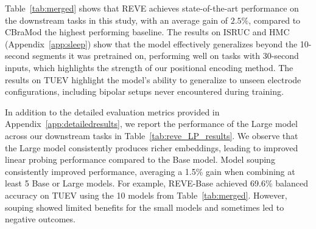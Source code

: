 \documentclass{article}
\begin{document}
Table~\ref{tab:merged} shows that REVE achieves state-of-the-art performance on the downstream tasks in this study, with an average gain of $2.5\%$, compared to CBraMod the highest performing baseline.
The results on ISRUC and HMC (Appendix~\ref{app:sleep}) show that the model effectively generalizes beyond the 10-second segments it was pretrained on, performing well on tasks with 30-second inputs, which highlights the strength of our positional encoding method. The results on TUEV highlight the model's ability to generalize to unseen electrode configurations, including bipolar setups never encountered during training. %

In addition to the detailed evaluation metrics provided in Appendix~\ref{app:detailedresults}, we report the performance of the Large model across our downstream tasks in Table~\ref{tab:reve_LP_results}. We observe that the Large model consistently produces richer embeddings, leading to improved linear probing performance compared to the Base model. Model souping consistently improved performance, averaging a 1.5\% gain when combining at least 5 Base or Large models. For example, REVE-Base achieved 69.6\% balanced accuracy on TUEV using the 10 models from Table~\ref{tab:merged}. However, souping showed limited benefits for the small models and sometimes led to negative outcomes.
\end{document}

